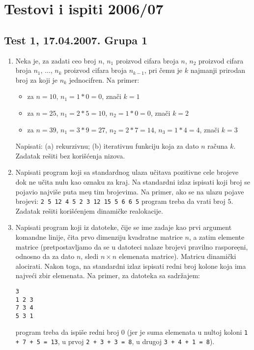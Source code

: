 \chapter{Testovi i ispiti 2006/07}

\section{Test 1, 17.04.2007. Grupa 1}


\begin{enumerate}

\item
Neka je, za zadati ceo broj $n$, $n_1$ proizvod cifara broja $n$,
$n_2$ proizvod cifara broja $n_1$, $\ldots$,
$n_k$ proizvod cifara broja $n_{k-1}$, pri \v cemu je
$k$ najmanji prirodan broj za koji je $n_k$ jednocifren. Na primer:
\begin{itemize}
\item za $n=10$, $n_1 = 1*0 = 0$, zna\v ci $k=1$
\item za $n=25$, $n_1 = 2*5 = 10$, $n_2 = 1*0 = 0$, zna\v ci $k=2$
\item za $n=39$, $n_1 = 3*9 = 27$, $n_2 = 2*7 = 14$, $n_3 = 1*4 = 4$,
zna\v ci $k=3$
\end{itemize}
Napisati: (a) rekurzivnu; (b) iterativnu funkciju koja za dato $n$
ra\v cuna $k$. Zadatak re\v siti bez kori\v s\' cenja nizova.

\item
Napisati program koji sa standardnog ulaza u\v citava pozitivne cele
brojeve dok ne u\v cita nulu kao oznaku za kraj. Na standardni izlaz
ispisati koji broj se pojavio najvi\v se puta me\d u tim brojevima.
Na primer, ako se na ulazu pojave brojevi:
\verb+2 5 12 4 5 2 3 12 15 5 6 6 5+
program treba da vrati broj $5$.
Zadatak re\v siti kori\v{s}\'cenjem dinami\v cke realokacije.

\item
Napisati program koji iz datoteke, \v cije se ime zadaje kao prvi
argument komandne linije, \v cita prvo dimenziju kvadratne matrice $n$,
a zatim elemente matrice (pretpostavljamo da se u datoteci nalaze brojevi
pravilno raspore\d eni,
odnosno da za dato $n$, sledi $n \times n$ elemenata matrice). Matricu
dinami\v cki alocirati.
Nakon toga, na standardni izlaz ispisati redni broj kolone koja ima
najve\' ci zbir elemenata.
Na primer, za datoteka sa sadr\v{z}ajem:
\vspace*{-8mm}
\begin{center}
\begin{verbatim}
3
1 2 3
7 3 4
5 3 1
\end{verbatim}
\end{center}
\vspace*{-3mm}
program treba da ispi\v se redni broj $0$ (jer je suma elemenata u nultoj
koloni \verb|1 + 7 + 5 = 13|, u prvoj \verb|2 + 3 + 3 = 8|, u drugoj
\verb|3 + 4 + 1 = 8|).
\end{enumerate}





